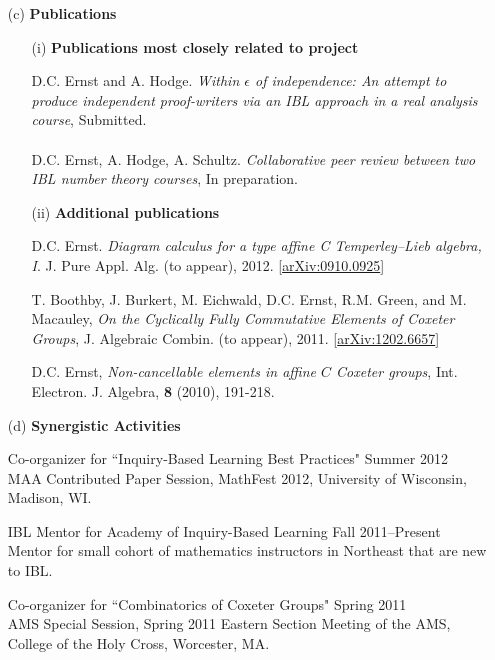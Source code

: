 \documentclass[11pt]{article}
\begin{document}
\begin{enumerate}[leftmargin=*]
\item[(c)] \textbf{Publications}

\begin{enumerate}[leftmargin=\parindent]
\item[(i)] \textbf{Publications most closely related to project}

D.C. Ernst and A. Hodge. \emph{Within $\epsilon$ of independence: An attempt to produce independent proof-writers via an IBL approach in a real analysis course}, Submitted.\\
\\
D.C. Ernst, A. Hodge, A. Schultz. \emph{Collaborative peer review between two IBL number theory courses}, In preparation.
 
\item[(ii)] \textbf{Additional publications}

D.C. Ernst. \emph{Diagram calculus for a type affine C Temperley--Lieb algebra, I}. J. Pure Appl. Alg. (to appear), 2012. [\href{http://arxiv.org/abs/0910.0925}{arXiv:0910.0925}]

\smallskip

T. Boothby, J. Burkert, M. Eichwald, D.C. Ernst, R.M. Green, and M. Macauley, \emph{On the Cyclically Fully Commutative Elements of Coxeter Groups}, J. Algebraic Combin. (to appear), 2011.  [\href{http://arxiv.org/abs/1202.6657}{arXiv:1202.6657}]

\smallskip

\noindent D.C. Ernst, \emph{Non-cancellable elements in affine $C$ Coxeter groups}, Int. Electron. J. Algebra, \textbf{8} (2010), 191-218.
\end{enumerate}
 
\item[(d)] \textbf{Synergistic Activities}

Co-organizer for ``Inquiry-Based Learning Best Practices" \hfill Summer 2012\\
MAA Contributed Paper Session, MathFest 2012, University of Wisconsin, Madison, WI.

\smallskip

IBL Mentor for  Academy of Inquiry-Based Learning \hfill Fall 2011--Present\\
Mentor for small cohort of mathematics instructors in Northeast that are new to IBL.

\smallskip

Co-organizer for ``Combinatorics of Coxeter Groups" \hfill Spring 2011\\
AMS Special Session, Spring 2011 Eastern Section Meeting of the AMS, College of the Holy Cross, Worcester, MA.


\end{enumerate}
\end{document}
